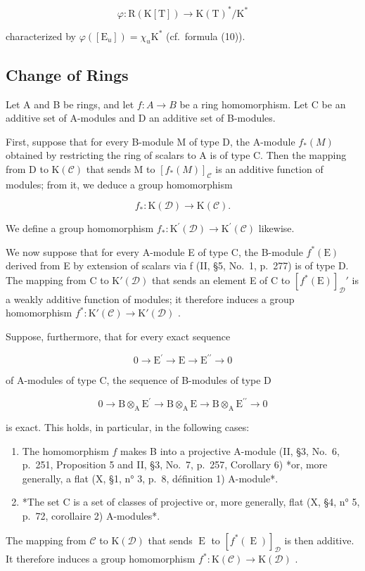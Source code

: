 \[
\varphi : \mathrm{R} (\mathrm{K} [ \mathrm{T} ]) \to \mathrm{K} (\mathrm{T}) ^ {*} / \mathrm{K} ^ {*}
\]

characterized by \(\varphi([\mathrm{E}_u]) = \chi_u\mathrm{K}^*\) (cf.~formula (10)).

\subsection{Change of Rings}

Let A and B be rings, and let \(f : A \to B\) be a ring homomorphism. Let C be an additive set of A-modules and D an additive set of B-modules.

First, suppose that for every B-module M of type D, the A-module \(f_{*}(M)\) obtained by restricting the ring of scalars to A is of type C. Then the mapping from D to \(\mathrm{K}(\mathcal{C})\) that sends M to \([f_{*}(M)]_{\mathcal{C}}\) is an additive function of modules; from it, we deduce a group homomorphism

\[
f _ {*}: \mathrm{K} (\mathcal {D}) \longrightarrow \mathrm{K} (\mathcal {C}).
\]

We define a group homomorphism \(f_{*}:\mathrm{K}^{\prime}(\mathcal{D})\to \mathrm{K}^{\prime}(\mathcal{C})\) likewise.

We now suppose that for every A-module E of type C, the B-module \(f^{*}(\mathrm{E})\) derived from E by extension of scalars via f (II, §5, No.~1, p.~277) is of type D. The mapping from C to \(\mathrm{K}'(\mathcal{D})\) that sends an element E of C to \([f^{*}(\mathrm{E})]_{\mathcal{D}}'\) is a weakly additive function of modules; it therefore induces a group homomorphism \(f^{*}: \mathrm{K}'(\mathcal{C}) \to \mathrm{K}'(\mathcal{D})\) .

Suppose, furthermore, that for every exact sequence

\[
0 \longrightarrow \mathrm{E} ^ {\prime} \longrightarrow \mathrm{E} \longrightarrow \mathrm{E} ^ {\prime \prime} \longrightarrow 0
\]

of A-modules of type C, the sequence of B-modules of type D

\[
0 \longrightarrow \mathrm{B} \otimes_ {\mathrm{A}} \mathrm{E} ^ {\prime} \longrightarrow \mathrm{B} \otimes_ {\mathrm{A}} \mathrm{E} \longrightarrow \mathrm{B} \otimes_ {\mathrm{A}} \mathrm{E} ^ {\prime \prime} \longrightarrow 0
\]

is exact. This holds, in particular, in the following cases:

\begin{enumerate}
\def\labelenumi{\alph{enumi})}
\item
  The homomorphism \(f\) makes B into a projective A-module (II, §3, No.~6, p.~251, Proposition 5 and II, §3, No.~7, p.~257, Corollary 6) *or, more generally, a flat (X, §1, n° 3, p.~8, définition 1) A-module*.
\item
  *The set C is a set of classes of projective or, more generally, flat (X, §4, n° 5, p.~72, corollaire 2) A-modules*.
\end{enumerate}

The mapping from \(\mathcal{C}\) to \(\mathrm{K}(\mathcal{D})\) that sends \(\operatorname{E}\) to \([f^{*}(\operatorname{E})]_{\mathcal{D}}\) is then additive. It therefore induces a group homomorphism \(f^{*}:\mathrm{K}(\mathcal{C})\to \mathrm{K}(\mathcal{D})\) .
